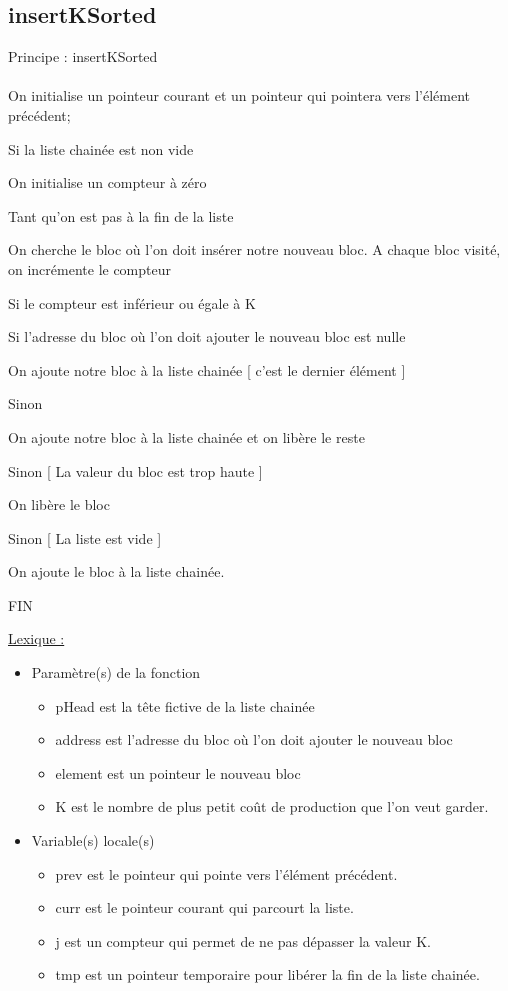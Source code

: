 \documentclass[a4paper]{article}
\newcommand\tab[1][1cm]{\hspace*{#1}}
\begin{document}
\subsection{insertKSorted}
\begin{algorithm}
Principe : insertKSorted
\\
\\
\tab On initialise un pointeur courant et un pointeur qui pointera vers l'élément précédent; 

\tab Si la liste chainée est non vide 

\tab \tab On initialise un compteur à zéro

\tab \tab Tant qu'on est pas à la fin de la liste

\tab \tab \tab On cherche le bloc où l'on doit insérer notre nouveau bloc. A chaque bloc visité, on 
\tab \tab \tab incrémente le compteur 

\tab \tab Si le compteur est inférieur ou égale à K 

\tab \tab \tab Si l'adresse du bloc où l'on doit ajouter le nouveau bloc est nulle 

\tab \tab \tab \tab On ajoute notre bloc à la liste chainée [ c'est le dernier élément ]

\tab \tab \tab Sinon  

\tab \tab \tab \tab On ajoute notre bloc à la liste chainée et on libère le reste 

\tab \tab Sinon [ La valeur du bloc est trop haute ]

\tab \tab \tab On libère le bloc

\tab Sinon [ La liste est vide ]

\tab \tab On ajoute le bloc à la liste chainée. 

FIN
\end{algorithm}
\underline{Lexique :}
\begin{itemize}
\item Paramètre(s) de la fonction  
\begin{itemize}
\item pHead est la tête fictive de la liste chainée
\item address est l’adresse du bloc où l'on doit ajouter le nouveau bloc
\item element est un pointeur le nouveau bloc
\item K est le nombre de plus petit coût de production que l'on veut garder. 
\end{itemize}
\item Variable(s) locale(s)
\begin{itemize}
\item prev est le pointeur qui pointe vers l'élément précédent.
\item curr est le pointeur courant qui parcourt la liste.
\item j est un compteur qui permet de ne pas dépasser la valeur K.
\item tmp est un pointeur temporaire pour libérer la fin de la liste chainée.
\end{itemize}
\end{itemize}
\end{document}
